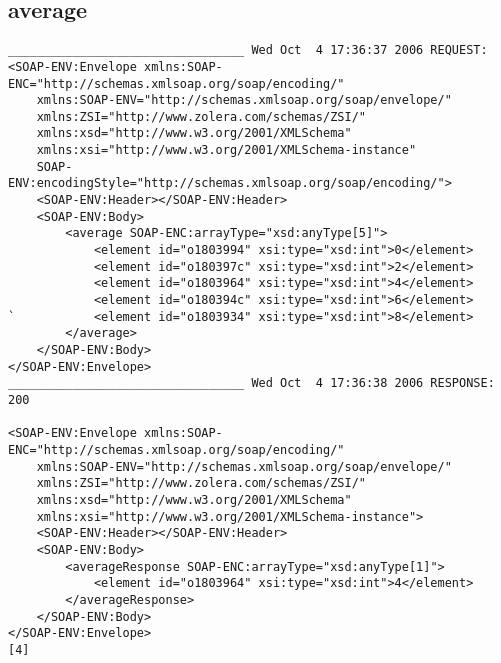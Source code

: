 \subsection{average}
\begin{verbatim}
_________________________________ Wed Oct  4 17:36:37 2006 REQUEST:
<SOAP-ENV:Envelope xmlns:SOAP-ENC="http://schemas.xmlsoap.org/soap/encoding/"
	xmlns:SOAP-ENV="http://schemas.xmlsoap.org/soap/envelope/"
	xmlns:ZSI="http://www.zolera.com/schemas/ZSI/"
	xmlns:xsd="http://www.w3.org/2001/XMLSchema"
	xmlns:xsi="http://www.w3.org/2001/XMLSchema-instance"
	SOAP-ENV:encodingStyle="http://schemas.xmlsoap.org/soap/encoding/">
	<SOAP-ENV:Header></SOAP-ENV:Header>
	<SOAP-ENV:Body>
		<average SOAP-ENC:arrayType="xsd:anyType[5]">
			<element id="o1803994" xsi:type="xsd:int">0</element>
			<element id="o180397c" xsi:type="xsd:int">2</element>
			<element id="o1803964" xsi:type="xsd:int">4</element>
			<element id="o180394c" xsi:type="xsd:int">6</element>
`			<element id="o1803934" xsi:type="xsd:int">8</element>
		</average>
	</SOAP-ENV:Body>
</SOAP-ENV:Envelope>
_________________________________ Wed Oct  4 17:36:38 2006 RESPONSE:
200

<SOAP-ENV:Envelope xmlns:SOAP-ENC="http://schemas.xmlsoap.org/soap/encoding/"
	xmlns:SOAP-ENV="http://schemas.xmlsoap.org/soap/envelope/"
	xmlns:ZSI="http://www.zolera.com/schemas/ZSI/"
	xmlns:xsd="http://www.w3.org/2001/XMLSchema"
	xmlns:xsi="http://www.w3.org/2001/XMLSchema-instance">
	<SOAP-ENV:Header></SOAP-ENV:Header>
	<SOAP-ENV:Body>
		<averageResponse SOAP-ENC:arrayType="xsd:anyType[1]">
			<element id="o1803964" xsi:type="xsd:int">4</element>
		</averageResponse>
	</SOAP-ENV:Body>
</SOAP-ENV:Envelope>
[4]
\end{verbatim}
